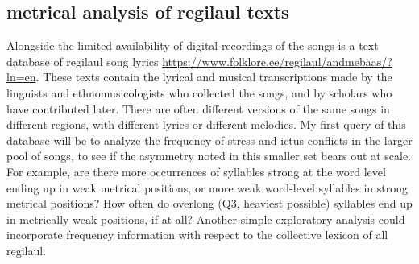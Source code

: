 %
%
%




\subsection{metrical analysis of regilaul texts}
Alongside the limited availability of digital recordings of the songs is a text database of regilaul song lyrics \url{https://www.folklore.ee/regilaul/andmebaas/?ln=en}. These texts contain the lyrical and musical transcriptions made by the linguists and ethnomusicologists who collected the songs, and by scholars who have contributed later. There are often different versions of the same songs in different regions, with different lyrics or different melodies. My first query of this database will be to analyze the frequency of stress and ictus conflicts in the larger pool of songs, to see if the asymmetry noted in this smaller set bears out at scale. 
 For example, are there more occurrences of syllables strong at the word level ending up in weak metrical positions, or more weak word-level syllables in strong metrical positions? How often do overlong (Q3, heaviest possible) syllables end up in metrically weak positions, if at all? Another simple exploratory analysis could incorporate frequency information with respect to the collective lexicon of all regilaul.  
 

